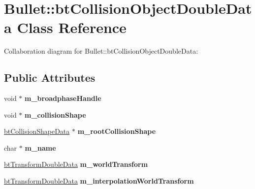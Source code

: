 \hypertarget{class_bullet_1_1bt_collision_object_double_data}{\section{Bullet\+:\+:bt\+Collision\+Object\+Double\+Data Class Reference}
\label{class_bullet_1_1bt_collision_object_double_data}
}


Collaboration diagram for Bullet\+:\+:bt\+Collision\+Object\+Double\+Data\+:
\subsection*{Public Attributes}
\begin{DoxyCompactItemize}
\item 
\hypertarget{class_bullet_1_1bt_collision_object_double_data_a9119cf05122be58d4a2bbc5a8eed10fc}{void $\ast$ {\bfseries m\+\_\+broadphase\+Handle}}\label{class_bullet_1_1bt_collision_object_double_data_a9119cf05122be58d4a2bbc5a8eed10fc}

\item 
\hypertarget{class_bullet_1_1bt_collision_object_double_data_a87174a2e12ec551d46569ca25cc2bb2c}{void $\ast$ {\bfseries m\+\_\+collision\+Shape}}\label{class_bullet_1_1bt_collision_object_double_data_a87174a2e12ec551d46569ca25cc2bb2c}

\item 
\hypertarget{class_bullet_1_1bt_collision_object_double_data_a364488ce87f7beff9c9d411c98cd95dc}{\hyperlink{class_bullet_1_1bt_collision_shape_data}{bt\+Collision\+Shape\+Data} $\ast$ {\bfseries m\+\_\+root\+Collision\+Shape}}\label{class_bullet_1_1bt_collision_object_double_data_a364488ce87f7beff9c9d411c98cd95dc}

\item 
\hypertarget{class_bullet_1_1bt_collision_object_double_data_ab1045b0602a46d5655149776054e2216}{char $\ast$ {\bfseries m\+\_\+name}}\label{class_bullet_1_1bt_collision_object_double_data_ab1045b0602a46d5655149776054e2216}

\item 
\hypertarget{class_bullet_1_1bt_collision_object_double_data_a7ca2c89da11c2dd7e6318fedd4ed0551}{\hyperlink{class_bullet_1_1bt_transform_double_data}{bt\+Transform\+Double\+Data} {\bfseries m\+\_\+world\+Transform}}\label{class_bullet_1_1bt_collision_object_double_data_a7ca2c89da11c2dd7e6318fedd4ed0551}

\item 
\hypertarget{class_bullet_1_1bt_collision_object_double_data_a1ecaa1ae269e2278a2ed3893391d6f0e}{\hyperlink{class_bullet_1_1bt_transform_double_data}{bt\+Transform\+Double\+Data} {\bfseries m\+\_\+interpolation\+World\+Transform}}\label{class_bullet_1_1bt_collision_object_double_data_a1ecaa1ae269e2278a2ed3893391d6f0e}


\end{DoxyCompactItemize}
